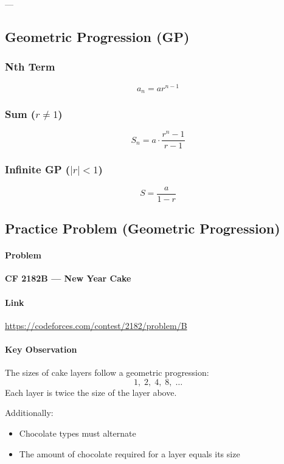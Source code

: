 \documentclass[11pt]{article}
\begin{document}
---

\subsection{Geometric Progression (GP)}

\subsubsection{Nth Term}
\[
a_n = a r^{n-1}
\]

\subsubsection{Sum ($r \neq 1$)}
\[
S_n = a \cdot \frac{r^n - 1}{r - 1}
\]

\subsubsection{Infinite GP ($|r| < 1$)}
\[
S = \frac{a}{1-r}
\]

\subsection{Practice Problem (Geometric Progression)}

\paragraph{Problem}
\textbf{CF 2182B — New Year Cake}

\paragraph{Link}
\url{https://codeforces.com/contest/2182/problem/B}

\paragraph{Key Observation}
The sizes of cake layers follow a geometric progression:
\[
1,\; 2,\; 4,\; 8,\; \dots
\]
Each layer is twice the size of the layer above.

Additionally:
\begin{itemize}
    \item Chocolate types must alternate
    \item The amount of chocolate required for a layer equals its size
\end{itemize}
\end{document}

